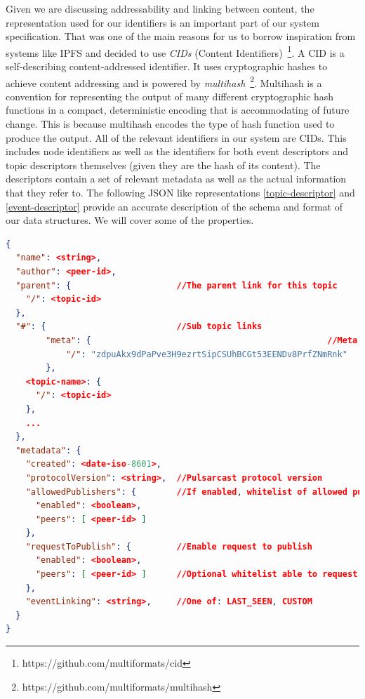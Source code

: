 Given we are discussing addressability and linking between content, the
representation used for our identifiers is an important part of our system
specification. That was one of the main reasons for us to borrow inspiration
from systems like IPFS and decided to use \emph{CIDs} (Content
Identifiers)~\footnote{https://github.com/multiformats/cid}.  A CID is a
self-describing content-addressed identifier. It uses cryptographic hashes to
achieve content addressing and is powered by
\emph{multihash}~\footnote{https://github.com/multiformats/multihash}.
Multihash is a convention for representing the output of many different
cryptographic hash functions in a compact, deterministic encoding that is
accommodating of future change. This is because multihash encodes the type of
hash function used to produce the output. All of the relevant identifiers in
our system are CIDs. This includes node identifiers as well as the identifiers
for both event descriptors and topic descriptors themselves (given they are the
hash of its content). The descriptors contain a set of relevant metadata as
well as the actual information that they refer to. The following JSON like
representations \ref{topic-descriptor} and \ref{event-descriptor} provide an
accurate description of the schema and format of our data structures. We will
cover some of the properties.

\begin{lstlisting}[float, language=JSON,caption={Topic descriptor schema in a JSON based format},label={topic-descriptor}]
{
  "name": <string>,
  "author": <peer-id>,
  "parent": {                     //The parent link for this topic
    "/": <topic-id>
  },
  "#": {                          //Sub topic links
		"meta": {												//Meta topic
			"/": "zdpuAkx9dPaPve3H9ezrtSipCSUhBCGt53EENDv8PrfZNmRnk"
		},
    <topic-name>: {
      "/": <topic-id>
    },
    ...
  },
  "metadata": {
    "created": <date-iso-8601>,
    "protocolVersion": <string>,  //Pulsarcast protocol version
    "allowedPublishers": {        //If enabled, whitelist of allowed publishers
      "enabled": <boolean>,
      "peers": [ <peer-id> ]
    },
    "requestToPublish": {         //Enable request to publish
      "enabled": <boolean>,
      "peers": [ <peer-id> ]      //Optional whitelist able to request
    },
    "eventLinking": <string>,     //One of: LAST_SEEN, CUSTOM
  }
}
\end{lstlisting}

